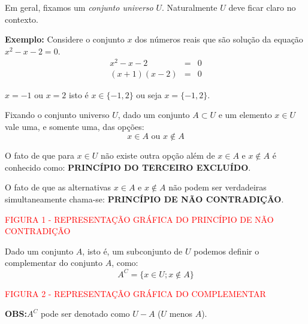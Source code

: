 \documentclass[oneside,a4paper,12pt]{article}
\begin{document}
Em geral, fixamos um {\it conjunto universo} $U$. Naturalmente $U$ deve ficar claro no contexto.

\textbf{Exemplo: }Considere o conjunto $x$ dos números reais que são solução da equação $x^2 - x - 2 = 0$.
\begin{eqnarray*}
x^2 - x -2 	&=&0\\
(x+1)(x-2)	&=&0
\end{eqnarray*}
	
$x=-1$ ou $x=2$ isto é $x \in \{-1,2\}$ ou seja $x=\{-1,2\}$.

Fixando o conjunto universo $U$, dado um conjunto $A \subset U$ e um elemento $x \in U$ vale uma, e somente uma, das opções:
$$ x \in A \text{ ou } x \notin A$$

O fato de que para $x \in U$ não existe outra opção além de $x \in A$ e $x \notin A$ é conhecido como: \textbf{PRINCÍPIO DO TERCEIRO EXCLUÍDO}. 

O fato de que as alternativas $x \in A$ e $x \notin A$ não podem ser verdadeiras simultaneamente chama-se: \textbf{PRINCÍPIO DE NÃO CONTRADIÇÃO}.

\vspace{150pt}
\begin{center}
	\textcolor{red}{FIGURA 1 - REPRESENTAÇÃO GRÁFICA DO PRINCÍPIO DE NÃO CONTRADIÇÃO}
\end{center}
	
Dado um conjunto $A$, isto é, um subconjunto de $U$ podemos definir o complementar do conjunto $A$, como:
$$A^{C} = \{ x \in U; x \notin A \}$$


\vspace{150pt}
\begin{center}
	\textcolor{red}{FIGURA 2 - REPRESENTAÇÃO GRÁFICA DO COMPLEMENTAR}
\end{center}

\textbf{OBS:}$A^{C}$ pode ser denotado como $U-A$ ($U$ menos $A$).
\end{document}
